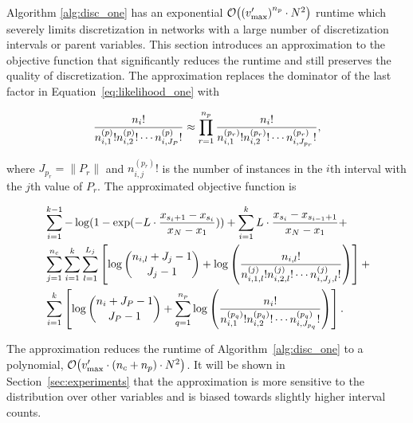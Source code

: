 Algorithm \ref{alg:disc_one} has an exponential $\bigo\paren{\paren{v'_\text{max}}^{n_p} \cdot N^2}$ runtime which severely limits discretization in networks with a large number of discretization intervals or parent variables.
This section introduces an approximation to the objective function that significantly reduces the runtime and still preserves the quality of discretization.
The approximation replaces the dominator of the last factor in Equation~\ref{eq:likelihood_one} with

\begin{equation}
{\frac{{n_i}!}{ {n^{(p)}_{i,1} !} {n^{(p)}_{i,2} !} \cdots {n^{(p)}_{i,J_P} !}}} \approx \prod_{r=1}^{n_p} { {{{n}_i}!}\over{ {n^{(p_r)}_{i,1} !} {n^{(p_r)}_{i,2} !} \cdots {n^{(p_r)}_{i,J_{p_r}} !}}}\text{,}
\end{equation}

\noindent
where $J_{p_r} = \| P_r\|$ and ${n^{(p_r)}_{i,j} !}$ is the number of instances in the $i$th interval with the $j$th value of $P_r$.
The approximated objective function is

\begin{small}
\begin{equation}
\begin{aligned}
\label{eq:opt_prob_approx}
& \sum_{i=1}^{k-1} - \log(1 - {\exp(- L \cdot {{x_{s_i+1} - x_{s_i}}\over{x_N - x_1}})}) +  \sum_{i=1}^{k} L \cdot {{x_{s_{i}} - x_{s_{i-1} + 1}}\over{x_N - x_1}} +\\
&  \sum_{j=1}^{n_c} \sum_{i=1}^{k}  \sum_{l=1}^{L_j} \left[  \log{{n_{i,l} + J_j - 1}\choose{J_j-1}} + \log \left( { {{n_{i,l}}!}\over{ {n^{(j)}_{i,1,l} !} {n^{(j)}_{i,2,l} !} \cdots {n^{(j)}_{i,J_j,l} !}} } \right) \right] + \\
& \sum_{i=1}^k \left[  \log {{n_{i} + J_P - 1}\choose{J_P-1}} + \sum_{q=1}^{n_p} \log \left( { {{{n}_i}!}\over{ {n^{(p_q)}_{i,1} !} {n^{(p_q)}_{i,2} !} \cdots {n^{(p_q)}_{i,J_{p_q}} !}}} \right) \right]\text{.}
\end{aligned}
\end{equation}
\end{small}

The approximation reduces the runtime of Algorithm~\ref{alg:disc_one} to a polynomial, $\bigo\paren{ {v'_\text{max}} \cdot (n_c + n_p) \cdot N^2}$.
It will be shown in Section~\ref{sec:experiments} that the approximation is more sensitive to the distribution over other variables and is biased towards slightly higher interval counts.

